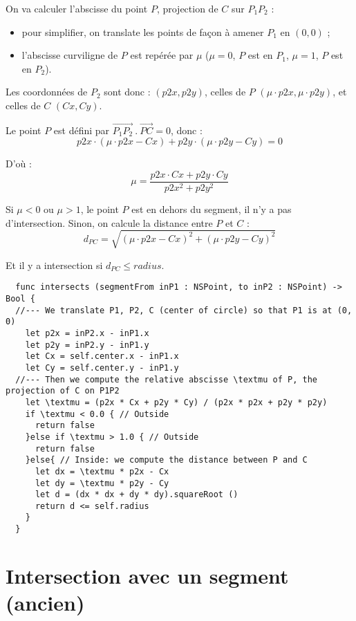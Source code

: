 On va calculer l'abscisse du point $P$, projection de $C$ sur $P_1P_2$ :
\begin{itemize}
  \item pour simplifier, on translate les points de façon à amener $P_1$ en $(0, 0)$ ;
  \item l'abscisse curviligne de $P$ est repérée par $\mu$ ($\mu = 0$, $P$ est en $P_1$, $\mu = 1$, $P$ est en $P_2$).
\end{itemize}
Les coordonnées de $P_2$ sont donc : $(p2x, p2y)$, celles de $P$ $(\mu\cdot p2x, \mu\cdot p2y)$, et celles de $C$ $(Cx, Cy)$.

Le point $P$ est défini par $\overrightarrow{P_1P_2}~.~\overrightarrow{PC} = 0$, donc :
\begin{equation*}
p2x \cdot (\mu\cdot p2x - Cx) + p2y \cdot (\mu\cdot p2y - Cy) = 0
\end{equation*}

D'où :
\begin{equation*}
\mu = \frac{p2x \cdot Cx+ p2y \cdot Cy}{p2x^2 + p2y^2}
\end{equation*}

Si $\mu < 0$ ou $\mu > 1$, le point $P$ est en dehors du segment, il n'y a pas d'intersection. Sinon, on calcule la distance entre $P$ et $C$ :
\begin{equation*}
d_{PC} = \sqrt{(\mu\cdot p2x - Cx)^2 + (\mu\cdot p2y - Cy)^2}
\end{equation*}

Et il y a intersection si $d_{PC} \leqslant radius$.


\begin{lstlisting}
  func intersects (segmentFrom inP1 : NSPoint, to inP2 : NSPoint) -> Bool {
  //--- We translate P1, P2, C (center of circle) so that P1 is at (0, 0)
    let p2x = inP2.x - inP1.x
    let p2y = inP2.y - inP1.y
    let Cx = self.center.x - inP1.x
    let Cy = self.center.y - inP1.y
  //--- Then we compute the relative abscisse \textmu of P, the projection of C on P1P2
    let \textmu = (p2x * Cx + p2y * Cy) / (p2x * p2x + p2y * p2y)
    if \textmu < 0.0 { // Outside
      return false
    }else if \textmu > 1.0 { // Outside
      return false
    }else{ // Inside: we compute the distance between P and C
      let dx = \textmu * p2x - Cx
      let dy = \textmu * p2y - Cy
      let d = (dx * dx + dy * dy).squareRoot ()
      return d <= self.radius
    }
  }
\end{lstlisting}


\section{Intersection avec un segment (ancien)}

